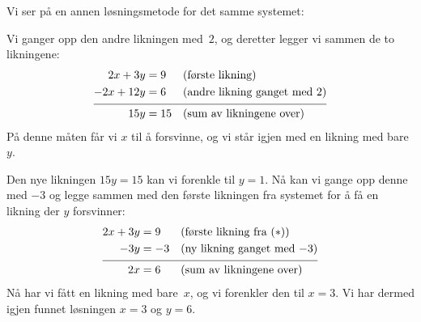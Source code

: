 
Vi ser på en annen løsningsmetode for det samme systemet:

\begin{ex}
Vi ganger opp den andre likningen med~$2$, og deretter legger vi
sammen de to likningene:
\begin{align*}
2x + 3y &= 9   &&\text{(første likning)} \\
-2x + 12y &= 6 &&\text{(andre likning ganget med~$2$)} \\[4pt] \hline
\rule{0pt}{11pt}
15y &= 15      &&\text{(sum av likningene over)}
\end{align*}
På denne måten får vi $x$ til å forsvinne, og vi står igjen med en
likning med bare~$y$.

Den nye likningen $15y = 15$ kan vi forenkle til $y=1$.  Nå kan vi
gange opp denne med $-3$ og legge sammen med den første likningen fra
systemet for å få en likning der $y$ forsvinner:
\begin{align*}
2x + 3y &= 9 &&\text{(første likning fra $(\ast)$)}\\
-3y &= -3    &&\text{(ny likning ganget med $-3$)} \\[4pt] \hline
\rule{0pt}{11pt}
2x &= 6      &&\text{(sum av likningene over)}
\end{align*}
Nå har vi fått en likning med bare~$x$, og vi forenkler den til
$x = 3$.
Vi har dermed igjen funnet løsningen $x = 3$ og $y = 6$.
\end{ex}





